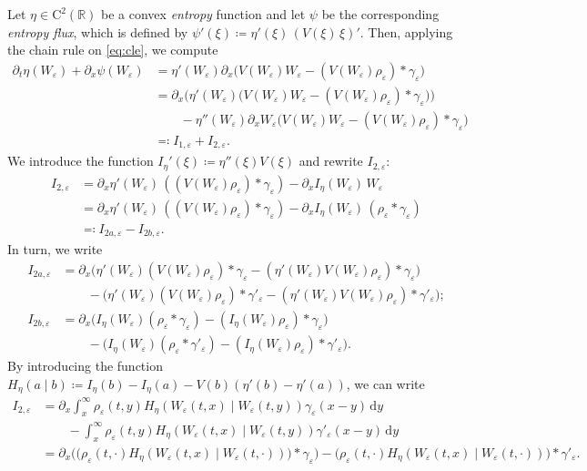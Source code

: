\documentclass[10pt]{amsart}
\theoremstyle{plain}
\theoremstyle{definition}
\numberwithin{equation}{section}
\newcommand{\R}{\mathbb{R}}
\newcommand{\eps}{{\varepsilon}}
\newcommand{\pt}{\partial_t}
\newcommand{\px}{\partial_x }
\begin{document}
Let $\eta \in \mathrm{C}^2(\R)$ be a convex \emph{entropy} function and let $\psi$ be the corresponding \emph{entropy flux}, which is defined by $\psi'(\xi) \coloneqq \eta'(\xi) \, (V(\xi)\,\xi)'$. Then, applying the chain rule on \cref{eq:cle}, we compute
\begin{align*}
    \pt \eta(W_\eps) + \partial_x \psi(W_\eps) &= \eta'(W_\eps)  \px \big(V(W_\eps)W_\eps - (V(W_\eps) \rho_\eps) \ast \gamma_\eps\big)
    \\&= \px \big(\eta'(W_\eps)   \big(V(W_\eps)W_\eps - (V(W_\eps) \rho_\eps) \ast \gamma_\eps\big)\big) \\ & \qquad - \eta''(W_\eps)   \px W_\eps \big(V(W_\eps)W_\eps - (V(W_\eps) \rho_\eps) \ast \gamma_\eps\big)
    \\ &\eqqcolon I_{1,\eps} + I_{2,\eps}. 
\end{align*}
We introduce the function $I_\eta'(\xi) \coloneqq  \eta''(\xi)V(\xi)$ and rewrite $I_{2,\eps}$:
\begin{align*}
    I_{2,\eps} &= \partial_x \eta'(W_\eps) \, ((V(W_\eps) \rho_\eps) \ast \gamma_\eps) - \partial_x I_\eta(W_\eps) \, W_\eps \\
    &= \partial_x \eta'(W_\eps) \, ((V(W_\eps) \rho_\eps) \ast \gamma_\eps) - \partial_x I_\eta(W_\eps) \, (\rho_\eps \ast \gamma_\eps) \\ &\eqqcolon I_{2a,\eps} - I_{2b,\eps}.
\end{align*}
In turn, we write 
\begin{align*}
    I_{2a,\eps} 
    &= \partial_x \big( \eta'(W_\eps) (V(W_\eps) \rho_\eps) \ast \gamma_\eps - (\eta'(W_\eps) V(W_\eps) \rho_\eps) \ast \gamma_\eps \big) \\
    &\qquad - \big( \eta'(W_\eps) (V(W_\eps) \rho_\eps) \ast \gamma'_\eps - (\eta'(W_\eps) V(W_\eps) \rho_\eps) \ast \gamma'_\eps \big);
\\
    I_{2b,\eps} &= \partial_x \big( I_\eta(W_\eps)  (\rho_\eps \ast \gamma_\eps) - (I_\eta(W_\eps) \rho_\eps) \ast \gamma_\eps \big) \\ &\qquad - \big( I_\eta(W_\eps) (\rho_\eps \ast \gamma'_\eps) - (I_\eta(W_\eps) \rho_\eps) \ast \gamma'_\eps \big).
\end{align*}
By introducing the function $H_\eta(a\mid b) \coloneqq  I_\eta(b) - I_\eta(a) - V(b)(\eta'(b)-\eta'(a))$, we can write
\begin{align*}
    I_{2,\eps}   &= \partial_x\int_x^\infty \rho_\eps(t,y) H_\eta(W_\eps(t,x)\mid W_\eps(t,y)) \gamma_\eps(x-y)\,\mathrm dy \\ &\qquad- \int_x^\infty \rho_\eps(t,y) H_\eta(W_\eps(t,x)\mid W_\eps(t,y)) \gamma'_\eps(x-y)\,\mathrm dy
\\ &= \partial_x \big( \big( \rho_\eps(t,\cdot) H_\eta(W_\eps(t,x)\mid W_\eps(t,\cdot)) \big) \ast\gamma_\eps \big) - \big( \rho_\eps(t,\cdot)  H_\eta(W_\eps(t,x)\mid W_\eps(t,\cdot)) \big) \ast\gamma'_\eps.
\end{align*}
\end{document}
